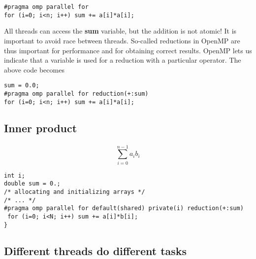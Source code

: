 \begin{verbatim}
#pragma omp parallel for
for (i=0; i<n; i++) sum += a[i]*a[i];

\end{verbatim}

All threads can access the \textbf{sum} variable, but the addition is not atomic! It is important to avoid race between threads. So-called reductions in OpenMP are thus important for performance and for obtaining correct results.  OpenMP lets us indicate that a variable is used for a reduction with a particular operator. The above code becomes




\begin{verbatim}
sum = 0.0;
#pragma omp parallel for reduction(+:sum)
for (i=0; i<n; i++) sum += a[i]*a[i];

\end{verbatim}



\subsection*{Inner product}

\paragraph{}
\[
\sum_{i=0}^{n-1} a_ib_i
\]








\begin{verbatim}
int i;
double sum = 0.;
/* allocating and initializing arrays */
/* ... */
#pragma omp parallel for default(shared) private(i) reduction(+:sum)
 for (i=0; i<N; i++) sum += a[i]*b[i];
}

\end{verbatim}



\subsection*{Different threads do different tasks}

